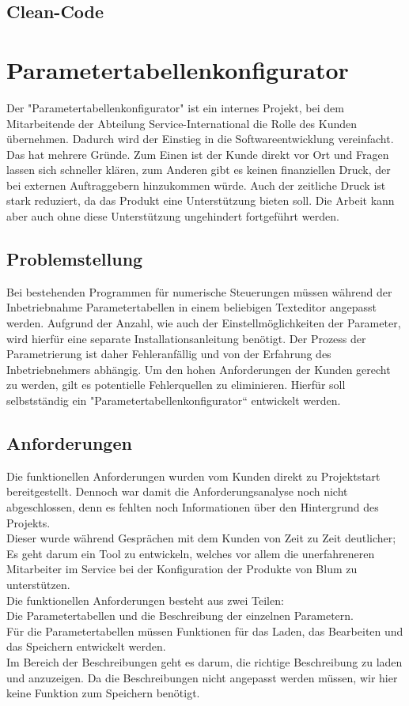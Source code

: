 \documentclass[a4paper,12pt,top=2.5cm,bottom=2.5cm, left=2.5cm, right=2.5cm, numbers=noenddot]{scrartcl}
\begin{document}
\subsection{Clean-Code}
\label{Clean-Code}
\section{Parametertabellenkonfigurator}
Der "Parametertabellenkonfigurator" ist ein internes Projekt, bei dem Mitarbeitende der Abteilung Service-International die Rolle des Kunden übernehmen. Dadurch wird der Einstieg in die Softwareentwicklung vereinfacht. \\
Das hat mehrere Gründe. Zum Einen ist der Kunde direkt vor Ort und Fragen lassen sich schneller klären, zum Anderen gibt es keinen finanziellen Druck, der bei externen Auftraggebern hinzukommen würde. Auch der zeitliche Druck ist stark reduziert, da das Produkt eine Unterstützung bieten soll. Die Arbeit kann aber auch ohne diese Unterstützung ungehindert fortgeführt werden.
\subsection{Problemstellung}
Bei bestehenden Programmen für numerische Steuerungen müssen während der Inbetriebnahme Parametertabellen in einem beliebigen Texteditor angepasst werden. Aufgrund der Anzahl, wie auch der Einstellmöglichkeiten der Parameter, wird hierfür eine separate Installationsanleitung benötigt. Der Prozess der Parametrierung ist daher Fehleranfällig und von der Erfahrung des Inbetriebnehmers abhängig. Um den hohen Anforderungen der Kunden gerecht zu werden, gilt es potentielle Fehlerquellen zu eliminieren. Hierfür soll selbstständig ein "Parametertabellenkonfigurator“ entwickelt werden.
\subsection{Anforderungen}
Die funktionellen Anforderungen wurden vom Kunden direkt zu Projektstart bereitgestellt. Dennoch war damit die Anforderungsanalyse noch nicht abgeschlossen, denn es fehlten noch Informationen über den Hintergrund des Projekts. \\
Dieser wurde während Gesprächen mit dem Kunden von Zeit zu Zeit deutlicher; Es geht darum ein Tool zu entwickeln, welches vor allem die unerfahreneren Mitarbeiter im Service bei der Konfiguration der Produkte von Blum zu unterstützen.\\
Die funktionellen Anforderungen besteht aus zwei Teilen: \\
Die Parametertabellen und die Beschreibung der einzelnen Parametern.\\
Für die Parametertabellen müssen Funktionen für das Laden, das Bearbeiten und das Speichern entwickelt werden.\\
Im Bereich der Beschreibungen geht es darum, die richtige Beschreibung zu laden und anzuzeigen. Da die Beschreibungen nicht angepasst werden müssen, wir hier keine Funktion zum Speichern benötigt.
\end{document}
